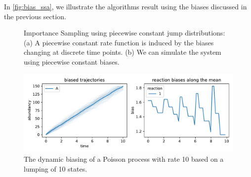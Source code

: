 In \autoref{fig:bias_ssa}, we illustrate the algorithms result using the biases discussed in the previous section.
\begin{figure}
    \centering
    \caption[Bias interpolation \& biased \ac{SSA}]{\label{fig:bias_ssa}}
    \caption[Importance Sampling using piecewise constant jump distributions]{Importance Sampling using piecewise constant jump distributions: (a) A piecewise constant rate function is induced by the biases changing at discrete time points. (b) We can simulate the system using piecewise constant biases.}
\end{figure}

\begin{figure}[htb]
    \centering
    \includegraphics[width=\textwidth]{gfx/poisson_sims_and_biases.pdf}
    \caption[Dynamic biasing for the Poisson process]{\label{fig:poisson_rare}The dynamic biasing of a Poisson process with rate 10 based on a lumping of \num{10} states.}
\end{figure}

